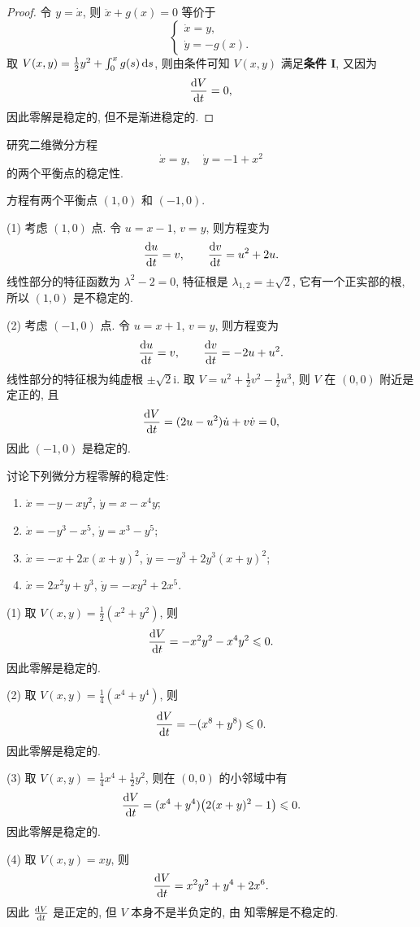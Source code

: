\begin{proof}
  令 $y = \dot{x}$, 则 $\ddot{x} + g(x) = 0$ 等价于
  \[\begin{cases}
    \dot{x} = y, \\
    \dot{y} = -g(x).
  \end{cases}\]
  取 $V(x,y) = \frac{1}{2}y^2 + \int_0^x g(s) \mathop{}\!\mathrm{d} s$, 则由条件可知
  $V(x,y)$ 满足\textbf{条件 I}, 又因为
  \[\frac{\mathop{}\!\mathrm{d} V}{\mathop{}\!\mathrm{d} t} = 0,\]
  因此零解是稳定的, 但不是渐进稳定的.
\end{proof}



\begin{exercise}
  研究二维微分方程
  \[\dot{x} = y,\quad \dot{y} = -1+x^2\]
  的两个平衡点的稳定性.
\end{exercise}

\begin{solution}
  方程有两个平衡点 $(1,0)$ 和 $(-1,0)$.

  (1) 考虑 $(1,0)$ 点. 令 $u = x-1$, $v = y$, 则方程变为
  \[\frac{\mathop{}\!\mathrm{d} u}{\mathop{}\!\mathrm{d} t} = v,\qquad \frac{\mathop{}\!\mathrm{d} v}{\mathop{}\!\mathrm{d} t} = u^2+2u.\]
  线性部分的特征函数为 $\lambda^2-2=0$, 特征根是 $\lambda_{1,2} = \pm\sqrt{2}$,
  它有一个正实部的根, 所以 $(1,0)$ 是不稳定的.

  (2) 考虑 $(-1,0)$ 点. 令 $u = x+1$, $v=y$, 则方程变为
  \[\frac{\mathop{}\!\mathrm{d} u}{\mathop{}\!\mathrm{d} t} = v,\qquad \frac{\mathop{}\!\mathrm{d} v}{\mathop{}\!\mathrm{d} t} = -2u + u^2.\]
  线性部分的特征根为纯虚根 $\pm\sqrt{2}\mathrm{i}$.
  取 $V = u^2 + \frac{1}{2}v^2 -\frac{1}{2}u^3$, 则 $V$ 在 $(0,0)$
  附近是定正的, 且
  \[\frac{\mathop{}\!\mathrm{d} V}{\mathop{}\!\mathrm{d} t} = (2u-u^2) \dot{u} + v\dot{v} = 0,\]
  因此 $(-1,0)$ 是稳定的.
\end{solution}



\begin{exercise}
  讨论下列微分方程零解的稳定性:
  \begin{enumerate}[(1)]
    \item $\dot{x} = -y-xy^2$, $\dot{y} = x-x^4y$;
    \item $\dot{x} = -y^3-x^5$, $\dot{y} = x^3-y^5$;
    \item $\dot{x} = -x+2x(x+y)^2$, $\dot{y} = -y^3+2y^3(x+y)^2$;
    \item $\dot{x} = 2x^2y+y^3$, $\dot{y} = -xy^2 + 2x^5$.
  \end{enumerate}
\end{exercise}

\begin{solution}
  (1) 取 $V(x,y) = \frac12 (x^2+y^2)$, 则
  \[\frac{\mathop{}\!\mathrm{d} V}{\mathop{}\!\mathrm{d} t} = -x^2 y^2 - x^4y^2 \leqslant 0.\]
  因此零解是稳定的.

  (2) 取 $V(x,y) = \frac{1}{4}(x^4+y^4)$, 则
  \[\frac{\mathop{}\!\mathrm{d} V}{\mathop{}\!\mathrm{d} t} = -(x^8+y^8) \leqslant 0.\]
  因此零解是稳定的.

  (3) 取 $V(x,y) = \frac14 x^4 + \frac12 y^2$, 则在 $(0,0)$ 的小邻域中有
  \[\frac{\mathop{}\!\mathrm{d} V}{\mathop{}\!\mathrm{d} t} = (x^4+y^4) \bigl(2(x+y)^2 - 1\bigr) \leqslant 0.\]
  因此零解是稳定的.

  (4) 取 $V(x,y) = xy$, 则
  \[\frac{\mathop{}\!\mathrm{d} V}{\mathop{}\!\mathrm{d} t} = x^2y^2 + y^4 + 2x^6.\]
  因此 $\frac{\mathop{}\!\mathrm{d} V}{\mathop{}\!\mathrm{d} t}$ 是正定的, 但 $V$ 本身不是半负定的,
  由 \cite[定理 3.3]{Ma-Zhou-Li} 知零解是不稳定的.
\end{solution}